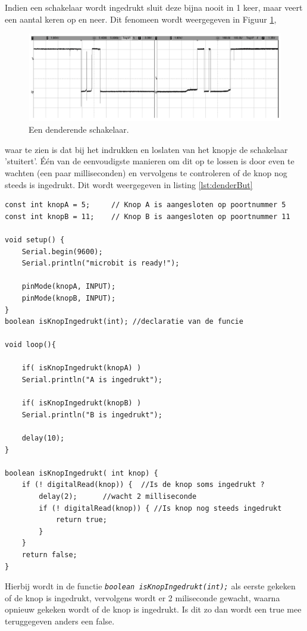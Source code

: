 Indien een schakelaar wordt ingedrukt sluit deze bijna nooit in 1 keer, maar veert een aantal keren op en neer. Dit fenomeen wordt weergegeven in Figuur \ref{fig:swDend}, 
\begin{figure}[h!]
	\captionsetup{justification=centering}
	\includegraphics[width=0.6 \linewidth]{figuren/denderen}
	\centering
	\caption{Een denderende schakelaar\cite{williams2014make}.}
	\label{fig:swDend}
\end{figure}
waar te zien is dat bij het indrukken en loslaten van het knopje de schakelaar 'stuitert'. 
Één van de eenvoudigste manieren om dit op te lossen is door even te wachten (een paar milliseconden) en vervolgens te controleren of de knop nog steeds is ingedrukt. Dit wordt weergegeven in listing \ref{lst:denderBut}
\newpage
\begin{lstlisting}[caption= Omgaan met een denderende schakelaar.,label={lst:denderBut}]
const int knopA = 5;     // Knop A is aangesloten op poortnummer 5
const int knopB = 11;    // Knop B is aangesloten op poortnummer 11

void setup() {  
	Serial.begin(9600);
	Serial.println("microbit is ready!");
	
	pinMode(knopA, INPUT);  
	pinMode(knopB, INPUT);   
}
boolean isKnopIngedrukt(int); //declaratie van de funcie

void loop(){
	
	if( isKnopIngedrukt(knopA) )
	Serial.println("A is ingedrukt");
	
	if( isKnopIngedrukt(knopB) )
	Serial.println("B is ingedrukt");       
	
	delay(10);
}

boolean isKnopIngedrukt( int knop) {
	if (! digitalRead(knop)) {  //Is de knop soms ingedrukt ?
		delay(2);      //wacht 2 milliseconde 
		if (! digitalRead(knop)) { //Is knop nog steeds ingedrukt
			return true;
		}
	}
	return false;
}
\end{lstlisting}

Hierbij wordt in de functie \texttt{\textit{\textcolor{arduinoBlue}{boolean} isKnopIngedrukt(\textcolor{arduinoBlue}{int});}} als eerste gekeken of de knop is ingedrukt, vervolgens wordt er 2 miliseconde gewacht, waarna opnieuw gekeken wordt of de knop is ingedrukt. Is dit zo dan wordt een \textcolor{arduinoBlue}{true} mee teruggegeven anders een \textcolor{arduinoBlue}{false}.

